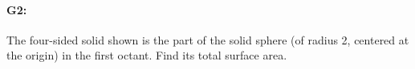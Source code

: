 \documentclass[pdftex, brazil, 12pt, twoside]{article}
\begin{document}
\begin{figure}[H]
  \begin{center}
    \label{fig:adv-g1}
  \end{center}
\end{figure}

\paragraph{G2:} The four-sided solid shown is the part of the solid sphere (of radius 2, centered at the origin) in the first octant. Find its total surface area.

\begin{figure}[H]
  \begin{center}
    \label{fig:adv-g2}
  \end{center}
\end{figure}
\end{document}
